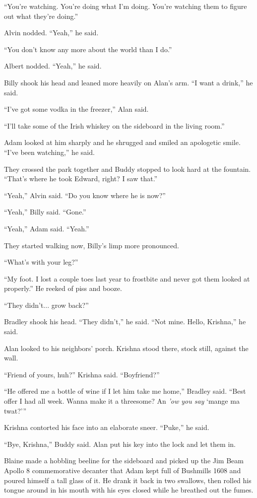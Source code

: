 \documentclass{article}
\begin{document}
``You're watching.  You're doing what I'm doing.  You're watching them
to figure out what they're doing.''

Alvin nodded.  ``Yeah,'' he said.

``You don't know any more about the world than I do.''

Albert nodded.  ``Yeah,'' he said.

Billy shook his head and leaned more heavily on Alan's arm.  ``I want
a drink,'' he said.

``I've got some vodka in the freezer,'' Alan said.

``I'll take some of the Irish whiskey on the sideboard in the living
room.''

Adam looked at him sharply and he shrugged and smiled an apologetic
smile.  ``I've been watching,'' he said.

They crossed the park together and Buddy stopped to look hard at the
fountain.  ``That's where he took Edward, right?  I saw that.''

``Yeah,'' Alvin said.  ``Do you know where he is now?''

``Yeah,'' Billy said.  ``Gone.''

``Yeah,'' Adam said.  ``Yeah.''

They started walking now, Billy's limp more pronounced.

``What's with your leg?''

``My foot.  I lost a couple toes last year to frostbite and never got
them looked at properly.'' He reeked of piss and booze.

``They didn't...  grow back?''

Bradley shook his head.  ``They didn't,'' he said.  ``Not mine. 
Hello, Krishna,'' he said.

Alan looked to his neighbors' porch.  Krishna stood there, stock
still, against the wall.

``Friend of yours, huh?'' Krishna said.  ``Boyfriend?''

``He offered me a bottle of wine if I let him take me home,'' Bradley
said.  ``Best offer I had all week.  Wanna make it a threesome?  An
\textit{'ow you say} `mange ma twat?'''

Krishna contorted his face into an elaborate sneer.  ``Puke,'' he
said.

``Bye, Krishna,'' Buddy said.  Alan put his key into the lock and let
them in.

Blaine made a hobbling beeline for the sideboard and picked up the Jim
Beam Apollo 8 commemorative decanter that Adam kept full of Bushmills
1608 and poured himself a tall glass of it.  He drank it back in two
swallows, then rolled his tongue around in his mouth with his eyes
closed while he breathed out the fumes.
\end{document}
